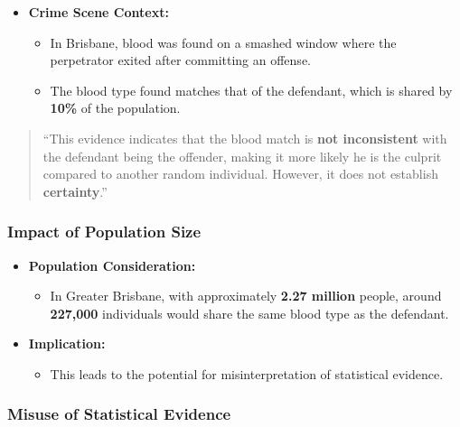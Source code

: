 \begin{itemize}
\tightlist
\item
  \textbf{Crime Scene Context:}

  \begin{itemize}
  \tightlist
  \item
    In Brisbane, blood was found on a smashed window where the
    perpetrator exited after committing an offense.
  \item
    The blood type found matches that of the defendant, which is shared
    by \textbf{10\%} of the population.
  \end{itemize}
\end{itemize}

\begin{quote}
``This evidence indicates that the blood match is \textbf{not
inconsistent} with the defendant being the offender, making it more
likely he is the culprit compared to another random individual. However,
it does not establish \textbf{certainty}.''
\end{quote}

\subsubsection{Impact of Population
Size}\label{impact-of-population-size}

\begin{itemize}
\tightlist
\item
  \textbf{Population Consideration:}

  \begin{itemize}
  \tightlist
  \item
    In Greater Brisbane, with approximately \textbf{2.27 million}
    people, around \textbf{227,000} individuals would share the same
    blood type as the defendant.
  \end{itemize}
\item
  \textbf{Implication:}

  \begin{itemize}
  \tightlist
  \item
    This leads to the potential for misinterpretation of statistical
    evidence.
  \end{itemize}
\end{itemize}

\subsubsection{Misuse of Statistical
Evidence}\label{misuse-of-statistical-evidence}


